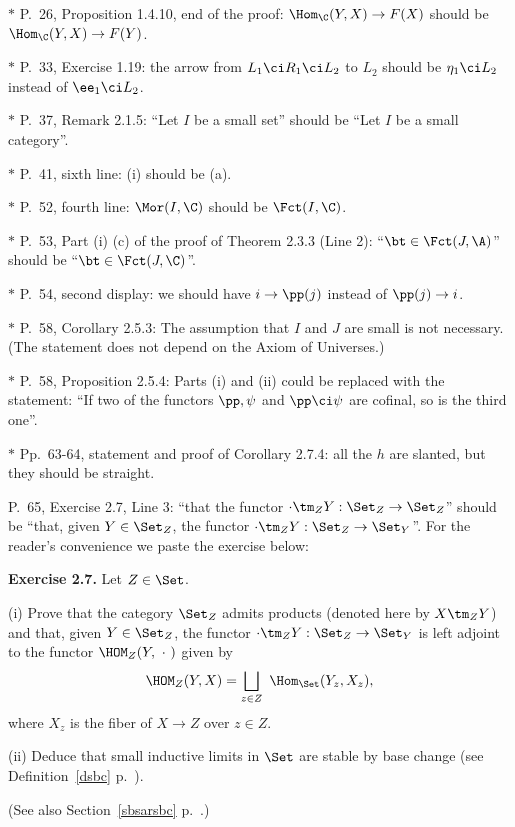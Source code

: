 \documentclass[12pt]{article}
\theoremstyle{remark}
\theoremstyle{definition}
\begin{document}
\nn$*$ P.~26, Proposition 1.4.10, end of the proof: $\Hom_\C(Y,X)\to F(X)$ should be $\Hom_\C(Y,X)\to F(Y)$. 

\nn$*$ P.~33, Exercise 1.19: the arrow from $L_1\ci R_1\ci L_2$ to $L_2$ should be $\eta_1\ci L_2$ instead of $\ee_1\ci L_2$. 

\nn$*$ P.~37, Remark 2.1.5: ``Let $I$ be a small set'' should be ``Let $I$ be a small category''.

\nn$*$ P.~41, sixth line: (i) should be (a). 

\nn$*$ P.~52, fourth line: $\Mor(I,\C)$ should be $\Fct(I,\C)$.

\nn$*$ P.~53, Part (i) (c) of the proof of Theorem 2.3.3 (Line 2): ``$\bt\in\Fct(J,\A)$'' should be ``$\bt\in\Fct(J,\C)$''.

\nn$*$ P.~54, second display: we should have $i\to\pp(j)$ instead of $\pp(j)\to i$.

\nn$*$ P.~58, Corollary 2.5.3: The assumption that $I$ and $J$ are small is not necessary. (The statement does not depend on the Axiom of Universes.) 

\nn$*$ P.~58, Proposition 2.5.4: Parts (i) and (ii) could be replaced with the statement: ``If two of the functors $\pp,\psi$ and $\pp\ci\psi$ are cofinal, so is the third one''.

\nn$*$ Pp.~63-64, statement and proof of Corollary 2.7.4: all the $h$ are slanted, but they should be straight.

\begin{s}
P.~65, Exercise 2.7, Line 3: ``that the functor $\cdot\tm_ZY:\Set_Z\to\Set_Z$'' should be ``that, given $Y\in\Set_Z$, the functor $\cdot\tm_ZY:\Set_Z\to\Set_Y$''. %
For the reader's convenience we paste the exercise below:

\nn\textbf{Exercise 2.7.} Let $Z\in\Set$.

\nn(i) Prove that the category $\Set_Z$ admits products (denoted here by $X\tm_Z Y$) and that, given $Y\in\Set_Z$, the functor $\cdot\tm_ZY:\Set_Z\to\Set_Y$ is left adjoint to the functor $\HOM_Z(Y,\ \cdot\ )$ given by 
$$
\HOM_Z(Y, X)=\bigsqcup_{z\in Z}\ \Hom_{\Set}(Y_z,X_z),
$$ 
where $X_z$ is the fiber of $X\to Z$ over $z\in Z$.

\nn(ii) Deduce that small inductive limits in $\Set$ are stable by base change (see Definition~\ref{dsbc} p.~).

(See also Section~\ref{sbsarsbc} p.~.)
\end{s}
\end{document}
